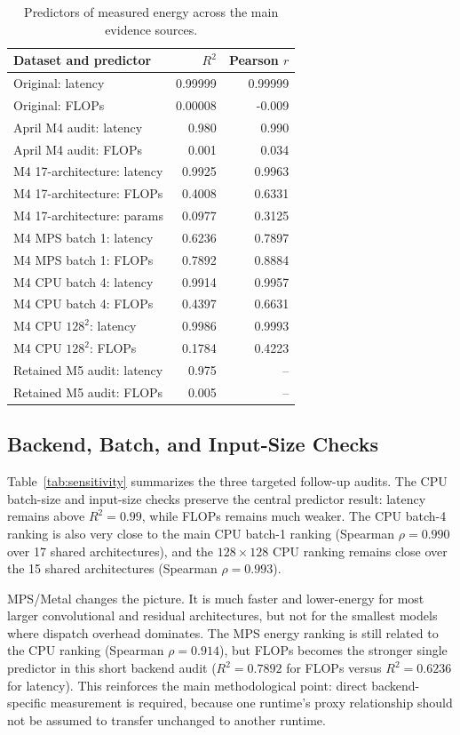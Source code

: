 \documentclass[conference]{IEEEtran}
\begin{document}
\begin{table}[t]
\centering
\caption{Predictors of measured energy across the main evidence sources.}
\label{tab:predictors}
\begin{tabular}{lrr}
\toprule
Dataset and predictor & $R^2$ & Pearson $r$ \\
\midrule
Original: latency & 0.99999 & 0.99999 \\
Original: FLOPs & 0.00008 & -0.009 \\
April M4 audit: latency & 0.980 & 0.990 \\
April M4 audit: FLOPs & 0.001 & 0.034 \\
M4 17-architecture: latency & 0.9925 & 0.9963 \\
M4 17-architecture: FLOPs & 0.4008 & 0.6331 \\
M4 17-architecture: params & 0.0977 & 0.3125 \\
M4 MPS batch 1: latency & 0.6236 & 0.7897 \\
M4 MPS batch 1: FLOPs & 0.7892 & 0.8884 \\
M4 CPU batch 4: latency & 0.9914 & 0.9957 \\
M4 CPU batch 4: FLOPs & 0.4397 & 0.6631 \\
M4 CPU $128^2$: latency & 0.9986 & 0.9993 \\
M4 CPU $128^2$: FLOPs & 0.1784 & 0.4223 \\
Retained M5 audit: latency & 0.975 & -- \\
Retained M5 audit: FLOPs & 0.005 & -- \\
\bottomrule
\end{tabular}
\end{table}

\subsection{Backend, Batch, and Input-Size Checks}

Table~\ref{tab:sensitivity} summarizes the three targeted follow-up audits.
The CPU batch-size and input-size checks preserve the central predictor
result: latency remains above $R^2=0.99$, while FLOPs remains much weaker. The
CPU batch-4 ranking is also very close to the main CPU batch-1 ranking
(Spearman $\rho=0.990$ over 17 shared architectures), and the $128\times128$
CPU ranking remains close over the 15 shared architectures
(Spearman $\rho=0.993$).

MPS/Metal changes the picture. It is much faster and lower-energy for most
larger convolutional and residual architectures, but not for the smallest
models where dispatch overhead dominates. The MPS energy ranking is still
related to the CPU ranking (Spearman $\rho=0.914$), but FLOPs becomes the
stronger single predictor in this short backend audit ($R^2=0.7892$ for FLOPs
versus $R^2=0.6236$ for latency). This reinforces the main methodological
point: direct backend-specific measurement is required, because one runtime's
proxy relationship should not be assumed to transfer unchanged to another
runtime.
\end{document}
